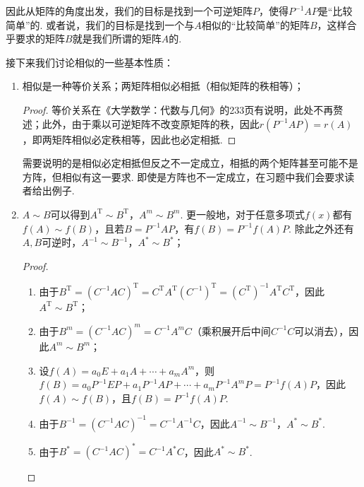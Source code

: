 因此从矩阵的角度出发，我们的目标是找到一个可逆矩阵$P$，使得$P^{-1}AP$是``比较简单''的. 或者说，我们的目标是找到一个与$A$相似的``比较简单''的矩阵$B$，这样合乎要求的矩阵$B$就是我们所谓的矩阵$A$的.

接下来我们讨论相似的一些基本性质：
\begin{enumerate}
    \item 相似是一种等价关系；两矩阵相似必相抵（相似矩阵的秩相等）；

          \begin{proof}
              等价关系在《大学数学：代数与几何》的233页有说明，此处不再赘述；此外，由于乘以可逆矩阵不改变原矩阵的秩，因此$r(P^{-1}AP)=r(A)$，即两矩阵相似必定秩相等，因此也必定相抵.
          \end{proof}

          需要说明的是相似必定相抵但反之不一定成立，相抵的两个矩阵甚至可能不是方阵，但相似有这一要求. 即使是方阵也不一定成立，在习题中我们会要求读者给出例子.

    \item $A\sim B$可以得到$A^\mathrm{T}\sim B^\mathrm{T}$，$A^m\sim B^m$. 更一般地，对于任意多项式$f(x)$都有$f(A)\sim f(B)$，且若$B=P^{-1}AP$，有$f(B)=P^{-1}f(A)P$. 除此之外还有$A,B$可逆时，$A^{-1}\sim B^{-1}$，$A^*\sim B^*$；

          \begin{proof}
              \begin{enumerate}
                  \item 由于$B^\mathrm{T}=(C^{-1}AC)^\mathrm{T}=C^\mathrm{T}A^\mathrm{T}(C^{-1})^\mathrm{T}=(C^\mathrm{T})^{-1}A^\mathrm{T}C^\mathrm{T}$，因此$A^\mathrm{T}\sim B^\mathrm{T}$；

                  \item 由于$B^m=(C^{-1}AC)^m=C^{-1}A^mC$（乘积展开后中间$C^{-1}C$可以消去），因此$A^m\sim B^m$；

                  \item 设$f(A)=a_0E+a_1A+\cdots+a_mA^m$，则$f(B)=a_0P^{-1}EP+a_1P^{-1}AP+\cdots+a_mP^{-1}A^mP=P^{-1}f(A)P$，因此$f(A)\sim f(B)$，且$f(B)=P^{-1}f(A)P$.

                  \item 由于$B^{-1}=(C^{-1}AC)^{-1}=C^{-1}A^{-1}C$，因此$A^{-1}\sim B^{-1}$，$A^*\sim B^*$.

                  \item 由于$B^*=(C^{-1}AC)^*=C^{-1}A^*C$，因此$A^*\sim B^*$.
              \end{enumerate}
          \end{proof}


\end{enumerate}
